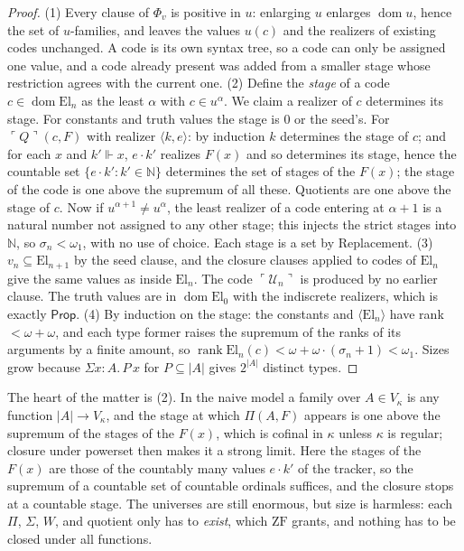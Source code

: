 \documentclass[10pt]{article}
\newcommand{\N}{\mathbb{N}}
\newcommand{\Prop}{\mathsf{Prop}}
\newcommand{\ZF}{\mathrm{ZF}}
\newcommand{\code}[1]{\ulcorner #1\urcorner}
\newcommand{\El}{\mathrm{El}}
\newcommand{\dom}{\operatorname{dom}}
\newcommand{\rk}{\operatorname{rank}}
\newcommand{\rz}{\Vdash}
\newcommand{\ap}{\cdot}
\newcommand{\U}{\mathcal{U}}
\begin{document}
\begin{proof}
(1) Every clause of $\Phi_v$ is positive in $u$: enlarging $u$ enlarges
$\dom u$, hence the set of $u$-families, and leaves the values $u(c)$ and
the realizers of existing codes unchanged. A code is its own syntax tree,
so a code can only be assigned one value, and a code already present was
added from a smaller stage whose restriction agrees with the current one.
(2) Define the \emph{stage} of a code $c\in\dom\El_n$ as the least $\alpha$
with $c\in u^\alpha$. We claim a realizer of $c$ determines its stage. For
constants and truth values the stage is $0$ or the seed's. For
$\code Q(c,F)$ with realizer $\langle k,e\rangle$: by induction $k$
determines the stage of $c$; and for each $x$ and $k'\rz x$, $e\ap k'$
realizes $F(x)$ and so determines its stage, hence the countable set
$\{e\ap k':k'\in\N\}$ determines the set of stages of the $F(x)$; the stage
of the code is one above the supremum of all these. Quotients are one above
the stage of $c$. Now if $u^{\alpha+1}\ne u^\alpha$, the least realizer of a
code entering at $\alpha+1$ is a natural number not assigned to any other
stage; this injects the strict stages into $\N$, so $\sigma_n<\omega_1$,
with no use of choice. Each stage is a set by Replacement.
(3) $v_n\subseteq\El_{n+1}$ by the seed clause, and the closure clauses
applied to codes of $\El_n$ give the same values as inside $\El_n$. The
code $\code{\U_n}$ is produced by no earlier clause. The truth values are
in $\dom\El_0$ with the indiscrete realizers, which is exactly $\Prop$.
(4) By induction on the stage: the constants and $\langle\El_n\rangle$ have
rank $<\omega+\omega$, and each type former raises the supremum of the
ranks of its arguments by a finite amount, so $\rk\El_n(c)<\omega+\omega
\cdot(\sigma_n+1)<\omega_1$. Sizes grow because $\Sigma x{:}A.\,P\,x$ for
$P\subseteq|A|$ gives $2^{|A|}$ distinct types.
\end{proof}

The heart of the matter is (2). In the naive model a family over
$A\in V_\kappa$ is any function $|A|\to V_\kappa$, and the stage at which
$\Pi(A,F)$ appears is one above the supremum of the stages of the $F(x)$,
which is cofinal in $\kappa$ unless $\kappa$ is regular; closure under
powerset then makes it a strong limit. Here the stages of the $F(x)$ are
those of the countably many values $e\ap k'$ of the tracker, so the
supremum of a countable set of countable ordinals suffices, and the
closure stops at a countable stage. The universes are still enormous, but
size is harmless: each $\Pi$, $\Sigma$, $W$, and quotient only has to
\emph{exist}, which $\ZF$ grants, and nothing has to be closed under all
functions.
\end{document}
